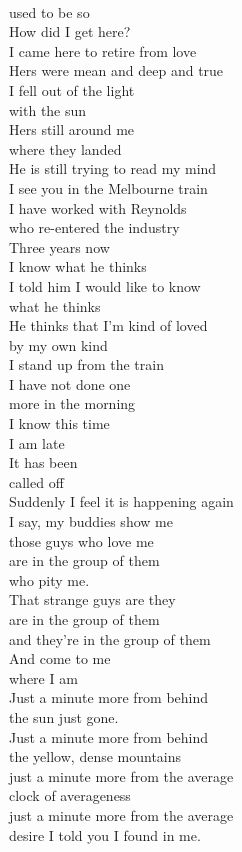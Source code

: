 \documentclass[smalldemyvopaper,11pt,twoside,onecolumn,openright,extrafontsizes]{memoir}
\begin{document}
\\used to be so
\\How did I get here?
\\I came here to retire from love
\\Hers were mean and deep and true
\\I fell out of the light
\\with the sun
\\Hers still around me
\\where they landed
\\He is still trying to read my mind
\\I see you in the Melbourne train
\\I have worked with Reynolds
\\who re-entered the industry
\\Three years now
\\I know what he thinks
\\I told him I would like to know
\\what he thinks
\\He thinks that I'm kind of loved
\\by my own kind
\\I stand up from the train
\\I have not done one
\\more in the morning
\\I know this time
\\I am late
\\It has been
\\called off
\\Suddenly I feel it is happening again
\\I say, my buddies show me
\\those guys who love me
\\are in the group of them
\\who pity me.
\\That strange guys are they
\\are in the group of them
\\and they're in the group of them
\\And come to me
\\where I am
\\Just a minute more from behind
\\the sun just gone.
\\Just a minute more from behind
\\the yellow, dense mountains
\\just a minute more from the average
\\clock of averageness
\\just a minute more from the average
\\desire I told you I found in me.
\end{document}

